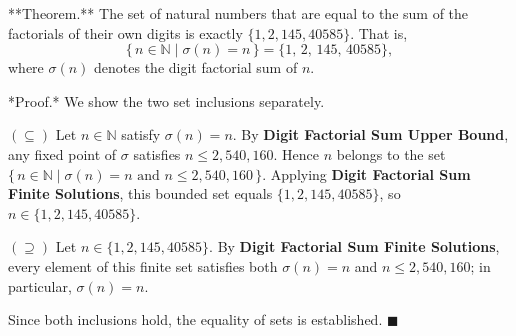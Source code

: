 **Theorem.** The set of natural numbers that are equal to the sum of the factorials of their own digits is exactly $\{1, 2, 145, 40585\}$. That is,
$$\{\, n \in \mathbb{N} \mid \sigma(n) = n \,\} = \{1,\, 2,\, 145,\, 40585\},$$
where $\sigma(n)$ denotes the digit factorial sum of $n$.

*Proof.* We show the two set inclusions separately.

$(\subseteq)$ Let $n \in \mathbb{N}$ satisfy $\sigma(n) = n$. By \textbf{Digit Factorial Sum Upper Bound}, any fixed point of $\sigma$ satisfies $n \leq 2{,}540{,}160$. Hence $n$ belongs to the set $\{\, n \in \mathbb{N} \mid \sigma(n) = n \text{ and } n \leq 2{,}540{,}160\,\}$. Applying \textbf{Digit Factorial Sum Finite Solutions}, this bounded set equals $\{1, 2, 145, 40585\}$, so $n \in \{1, 2, 145, 40585\}$.

$(\supseteq)$ Let $n \in \{1, 2, 145, 40585\}$. By \textbf{Digit Factorial Sum Finite Solutions}, every element of this finite set satisfies both $\sigma(n) = n$ and $n \leq 2{,}540{,}160$; in particular, $\sigma(n) = n$.

Since both inclusions hold, the equality of sets is established. $\blacksquare$